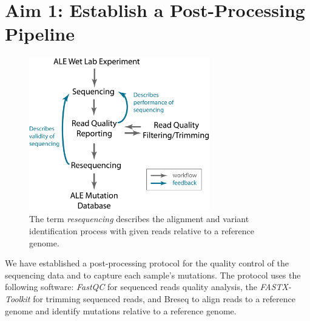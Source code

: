 \documentclass[12pt,final,masters,chapterheads]{ucsd}  %
\begin{document}
\chapter{Aim 1: Establish a Post-Processing Pipeline}


\begin{figure}[h!]
  \centering
  \includegraphics[width=0.7\textwidth]{post-processing-protocol.png}
  \caption[An illustration of the ALE sample post-processing protocol, software pipeline and feedback targets. ]{The term \textit{resequencing} describes the alignment and variant identification process with given reads relative to a reference genome.}
  \label{fig:post_processing_protocol}
\end{figure}
We have established a post-processing protocol for the quality control of the sequencing data and to capture each sample's mutations. The protocol uses the following software: \textit{FastQC} \cite{Andrew} for sequenced reads quality analysis, the \textit{FASTX-Toolkit} \cite{FASTX-Toolkit} for trimming sequenced reads, and Breseq \cite{breseq_paper} to align reads to a reference genome and identify mutations relative to a reference genome.

%
%
\end{document}
